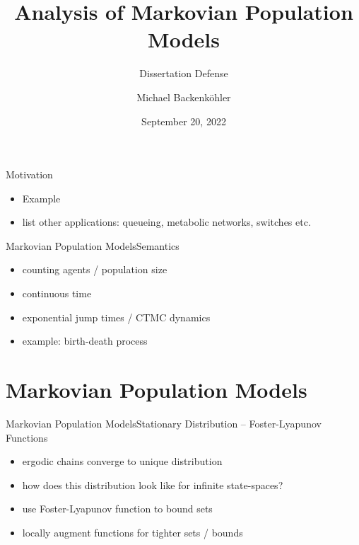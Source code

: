 \documentclass{beamer}
\title{Analysis of Markovian Population Models}
\subtitle{Dissertation Defense}
\author{Michael Backenk\"{o}hler}
\institute{Saarland Informatics Campus}
\date{September 20, 2022}
\begin{document}
\begin{frame}
\titlepage
\end{frame}

\begin{frame}{Motivation}
  \begin{itemize}
    \item Example
    \item list other applications: queueing, metabolic networks, switches etc.
  \end{itemize}
\end{frame}

\begin{frame}{Markovian Population Models}{Semantics}
  \begin{itemize}
    \item counting agents / population size
    \item continuous time
    \item exponential jump times / CTMC dynamics
    \item example: birth-death process
  \end{itemize}
\end{frame}

\section{Markovian Population Models}
\begin{frame}{Markovian Population Models}{Stationary Distribution -- Foster-Lyapunov Functions}
    \begin{itemize}
        \item ergodic chains converge to unique distribution
        \item how does this distribution look like for infinite state-spaces?
        \item use Foster-Lyapunov function to bound sets
        \item locally augment functions for tighter sets / bounds
    \end{itemize}
\end{frame}
\end{document}
